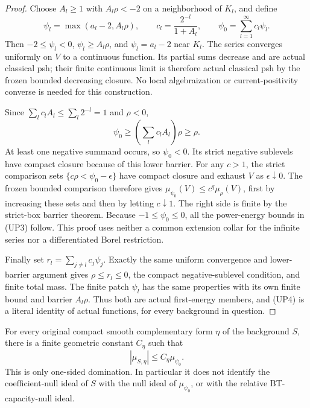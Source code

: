 \begin{proof}
Choose $A_l\geq1$ with $A_l\rho<-2$ on a neighborhood of $K_l$,
and define
\[
 \psi_l=\max(a_l-2,A_l\rho),\qquad
 c_l=\frac{2^{-l}}{1+A_l},\qquad
                     \psi_0=\sum_{l=1}^\infty c_l\psi_l.
 \tag{UP5}
\]
Then $-2\leq\psi_l<0$, $\psi_l\geq A_l\rho$, and
$\psi_l=a_l-2$ near $K_l$.  The series converges uniformly on
$V$ to a continuous function.  Its partial sums decrease and
are actual classical psh; their finite continuous limit is
therefore actual classical psh by the frozen bounded decreasing
closure.  No local algebraization or current-positivity converse
is needed for this construction.

Since $\sum_lc_lA_l\leq\sum_l2^{-l}=1$ and $\rho<0$,
\[
           \psi_0\geq\left(\sum_lc_lA_l\right)\rho\geq\rho.
\]
At least one negative summand occurs, so $\psi_0<0$.
Its strict negative sublevels have compact closure because of
this lower barrier.  For any $c>1$, the strict comparison sets
$\{c\rho<\psi_0-\epsilon\}$ have compact closure and exhaust
$V$ as $\epsilon\downarrow0$.  The frozen bounded comparison
therefore gives $\mu_{\psi_0}(V)\leq c^q\mu_\rho(V)$, first
by increasing these sets and then by letting $c\downarrow1$.
The right side is finite by the strict-box barrier theorem.
Because $-1\leq\psi_0\leq0$, all the power-energy bounds in
(UP3) follow.  This proof uses neither a common extension collar
for the infinite series nor a differentiated Borel restriction.

Finally set $r_l=\sum_{j\ne l}c_j\psi_j$.  Exactly the same
uniform convergence and lower-barrier argument gives
$\rho\leq r_l\leq0$, the compact negative-sublevel condition,
and finite total mass.  The finite patch $\psi_l$ has the
same properties with its own finite bound and barrier $A_l\rho$.
Thus both are actual first-energy members, and (UP4) is a literal
identity of actual functions, for every background in question.
\end{proof}

\begin{corollary}
\label{cor:r12-universal-probe-background-control}
For every original compact smooth complementary form $\eta$ of
the background $S$, there is a finite geometric constant $C_\eta$
such that
\[
                         |\mu_{S,\eta}|\leq C_\eta\mu_{\psi_0}.
 \tag{UP6}
\]
This is only one-sided domination.  In particular it does not
identify the coefficient-null ideal of $S$ with the null ideal of
$\mu_{\psi_0}$, or with the relative BT-capacity-null ideal.
\end{corollary}

